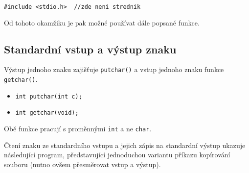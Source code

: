       \lstinline[style=luaCStyle]!#include <stdio.h>  //zde neni strednik!
  
      Od tohoto okamžiku je pak možné používat dále popsané funkce.
  
    \subsection{Standardní vstup a výstup znaku}
      Výstup jednoho znaku zajišťuje \lstinline[style=luaCStyle]!putchar()! a vstup jednoho 
      znaku funkce \lstinline[style=luaCStyle]!getchar()!.
      \begin{itemize}
        \item \lstinline[style=luaCStyle]!int putchar(int c);!
        \item \lstinline[style=luaCStyle]!int getchar(void);!
      \end{itemize}
      Obě funkce pracují s proměnnými \lstinline[style=luaCStyle]!int! a ne 
      \lstinline[style=luaCStyle]!char!.
  
         
      
      \begin{example}Čtení znaku ze standardního vstupu a jejich zápis na standardní výstup 
        ukazuje následující program, představující jednoduchou variantu příkazu kopírování souboru 
        (nutno ovšem přesměrovat vstup a výstup).
  
        
      \end{example}
      
